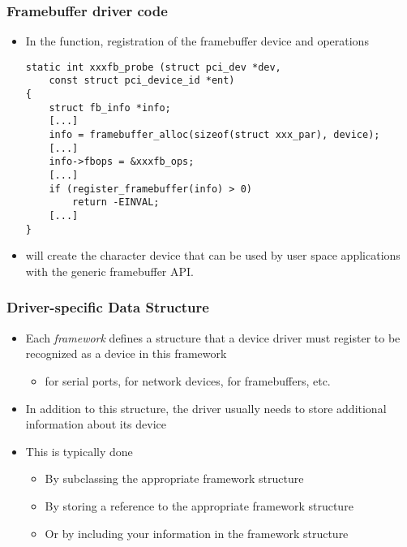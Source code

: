 \begin{frame}[fragile]
  \frametitle{Framebuffer driver code}
  \begin{itemize}
  \item In the  function, registration of the
    framebuffer device and operations
  \begin{verbatim}
static int xxxfb_probe (struct pci_dev *dev,
    const struct pci_device_id *ent)
{
    struct fb_info *info;
    [...]
    info = framebuffer_alloc(sizeof(struct xxx_par), device);
    [...]
    info->fbops = &xxxfb_ops;
    [...]
    if (register_framebuffer(info) > 0)
        return -EINVAL;
    [...]
}
  \end{verbatim}
  \item {} will create the character device
    that can be used by user space applications with the generic
    framebuffer API.
\end{itemize}
\end{frame}

\begin{frame}
  \frametitle{Driver-specific Data Structure}
  \begin{itemize}
  \item Each \emph{framework} defines a structure that a device driver
    must register to be recognized as a device in this framework
    \begin{itemize}
    \item {} for serial ports,  for network
      devices,  for framebuffers, etc.
    \end{itemize}
  \item In addition to this structure, the driver usually needs to
    store additional information about its device
  \item This is typically done
    \begin{itemize}
    \item By subclassing the appropriate framework structure
    \item By storing a reference to the appropriate framework
      structure
    \item Or by including your information in the framework structure
    \end{itemize}
  \end{itemize}
\end{frame}

